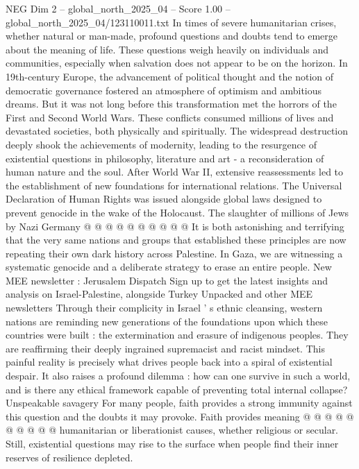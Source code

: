 \begin{textsample}{NEG Dim 2 – global\_north\_2025\_04 – Score 1.00 – global\_north\_2025\_04/123110011.txt}  \label{ex:f2_neg_019}
In times of severe humanitarian crises, whether natural or man-made, profound questions and doubts tend to emerge about the meaning of life.
These questions weigh heavily on individuals and communities, especially when salvation does not appear to be on the horizon.
In 19th-century Europe, the advancement of political thought and the notion of democratic governance fostered an atmosphere of optimism and ambitious dreams.
But it was not long before this transformation met the horrors of the First and Second World Wars.
These conflicts consumed millions of lives and devastated societies, both physically and spiritually.
The widespread destruction deeply shook the achievements of modernity, leading to the resurgence of existential questions in philosophy, literature and art - a reconsideration of human nature and the soul.
After World War II, extensive reassessments led to the establishment of new foundations for international relations.
The Universal Declaration of Human Rights was issued alongside global laws designed to prevent genocide in the wake of the Holocaust.
The slaughter of millions of Jews by Nazi Germany @ @ @ @ @ @ @ @ @ @ It is both astonishing and terrifying that the very same nations and groups that established these principles are now repeating their own dark history across Palestine.
In Gaza, we are witnessing a systematic genocide and a deliberate strategy to erase an entire people.
New MEE newsletter : Jerusalem Dispatch Sign up to get the latest insights and analysis on Israel-Palestine, alongside Turkey Unpacked and other MEE newsletters Through their complicity in Israel ' s ethnic cleansing, western nations are reminding new generations of the foundations upon which these countries were built : the extermination and erasure of indigenous peoples.
They are reaffirming their deeply ingrained supremacist and racist mindset.
This painful reality is precisely what drives people back into a spiral of existential despair.
It also raises a profound dilemma : how can one survive in such a world, and is there any ethical framework capable of preventing total internal collapse?
Unspeakable savagery For many people, faith provides a strong immunity against this question and the doubts it may provoke.
Faith provides meaning @ @ @ @ @ @ @ @ @ @ humanitarian or liberationist causes, whether religious or secular.
Still, existential questions may rise to the surface when people find their inner reserves of resilience depleted.

\end{textsample}
